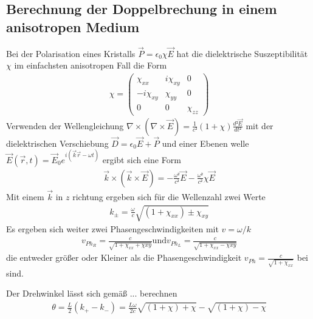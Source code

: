 \subsection{Berechnung der Doppelbrechung in einem anisotropen Medium \cite{man_a} }
Bei der Polarisation eines Kristalls $\vec{P} = \epsilon_0 \chi \vec{E}$ hat die dielektrische Suszeptibilität $\chi$
im einfachsten anisotropen Fall die Form
\begin{align}
	\chi = %
	\begin{pmatrix}
		\chi_{xx}     & i \chi_{xy} & 0         \\
		- i \chi_{xy} & \chi_{yy}   & 0         \\
		0             & 0           & \chi_{zz}
	\end{pmatrix}
\end{align}
Verwenden der Wellengleichung $\nabla \times (\nabla \times \vec{E}) = \frac{1}{c²}(1 + \chi)\frac{d² \vec{E}}{d t²}$
mit der dielektrischen Verschiebung $\vec{D} = \epsilon_0 \vec{E}+ \vec{P}$ und einer Ebenen welle 
$\vec{E}(\vec{r},t) = \vec{E}_0 e^{i(\vec{k}\vec{r} - \omega t)}$ ergibt sich eine Form
\begin{align}
	\vec{k} \times (\vec{k} \times \vec{E})= -\frac{\omega²}{c²} \vec{E}- \frac{\omega²}{c²}\chi \vec{E}
\end{align}
Mit einem $\vec{k}$ in $z$ richtung ergeben sich für die Wellenzahl zwei Werte
\begin{align}
	k_{\pm} = \frac{\omega}{c}\sqrt{(1+\chi_{xx})\pm \chi_{xy}}
\end{align}
Es ergeben sich weiter zwei Phasengeschwindigkeiten mit $v = \omega/ k$
\begin{align}
	v_{Ph_R} = \frac{c}{\sqrt{1+\chi_{xx}+\chi{xy}}} \text{und} v_{Ph_L} = \frac{c}{\sqrt{1+\chi_{xx}-\chi{xy}}}
\end{align}
die entweder größer oder Kleiner als die Phasengeschwindigkeit $v_{Ph}= \frac{c}{\sqrt{1+\chi_{xx}}}$ bei $	$ sind. 


Der Drehwinkel lässt sich gemäß ... berechnen
\begin{align}
	\theta = \frac{L}{2}(k_+ -k_-) = \frac{L\omega}{2c}{ \sqrt{(1+ \chi )+ \chi} - \sqrt{(1+ \chi )-\chi} }
\end{align}

